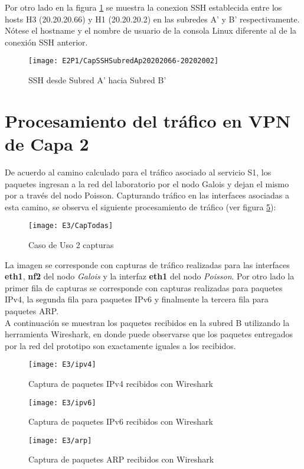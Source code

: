 Por otro lado en la figura \ref{fig:CapSSHSApSBp} se muestra la conexion SSH establecida entre los hosts H3 (20.20.20.66) y H1 (20.20.20.2) en las subredes A' y B' respectivamente. N\'otese el hostname y el nombre de usuario de la consola Linux diferente al de la conexi\'on SSH anterior. 

\newpage
\begin{figure}[ht!] 
\centering    
\texttt{[image: E2P1/CapSSHSubredAp20202066-20202002]}
\caption[SSH desde Subred A' hacia Subred B']{SSH desde Subred A' hacia Subred B'}
\label{fig:CapSSHSApSBp}
\end{figure}

\section{Procesamiento del tr\'afico en VPN de Capa 2}
De acuerdo al camino calculado para el tr\'afico asociado al servicio S1, los paquetes ingresan a la red del laboratorio por el nodo Galois y dejan el mismo por a través del nodo Poisson. Capturando tr\'afico en las interfaces asociadas a esta camino, se observa el siguiente procesamiento de tr\'afico  
 (ver figura \ref{fig:CapturaTCP}):

\begin{figure}[h!] 
\centering    
\texttt{[image: E3/CapTodas]}
\caption[Caso de Uso 2 capturas]{Caso de Uso 2 capturas}
\label{fig:CapturaTCP}
\end{figure}

La imagen se corresponde con capturas de tr\'afico realizadas para las interfaces \textbf{eth1}, \textbf{nf2} del nodo \textit{Galois} y la interfaz \textbf{eth1} del nodo \textit{Poisson}. Por otro lado la primer fila de capturas se corresponde con capturas realizadas para paquetes IPv4, la segunda fila para paquetes IPv6 y finalmente la tercera fila para paquetes ARP.\\

A continuaci\'on se muestran los paquetes recibidos en la subred B utilizando la herramienta Wireshark, en donde puede observarse que los paquetes entregados por la red del prototipo son exactamente iguales a los recibidos.

\newpage
\begin{figure}[h!] 
\centering    
\texttt{[image: E3/ipv4]}
\caption[Captura de paquetes IPv4 recibidos con Wireshark]{Captura de paquetes IPv4 recibidos con Wireshark}
\label{fig:CapturaTCP}
\end{figure}

\begin{figure}[h!] 
\centering    
\texttt{[image: E3/ipv6]}
\caption[Captura de paquetes IPv6 recibidos con Wireshark]{Captura de paquetes IPv6 recibidos con Wireshark}
\label{fig:CapturaTCP}
\end{figure}

\begin{figure}[h!] 
\centering    
\texttt{[image: E3/arp]}
\caption[Captura de paquetes ARP recibidos con Wireshark]{Captura de paquetes ARP recibidos con Wireshark}
\label{fig:CapturaTCP}
\end{figure}